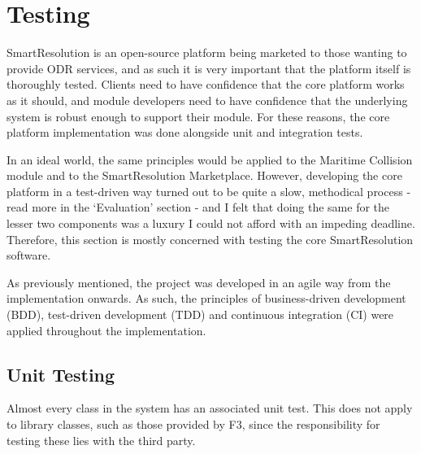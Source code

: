\chapter{Testing} %

SmartResolution is an open-source platform being marketed to those wanting to provide ODR services, and as such it is very important that the platform itself is thoroughly tested. Clients need to have confidence that the core platform works as it should, and module developers need to have confidence that the underlying system is robust enough to support their module. For these reasons, the core platform implementation was done alongside unit and integration tests.

In an ideal world, the same principles would be applied to the Maritime Collision module and to the SmartResolution Marketplace. However, developing the core platform in a test-driven way turned out to be quite a slow, methodical process - read more in the `Evaluation' section - and I felt that doing the same for the lesser two components was a luxury I could not afford with an impeding deadline. Therefore, this section is mostly concerned with testing the core SmartResolution software.

As previously mentioned, the project was developed in an agile way from the implementation onwards. As such, the principles of business-driven development (BDD), test-driven development (TDD) and continuous integration (CI) were applied throughout the implementation.

\section{Unit Testing}

Almost every class in the system has an associated unit test. This does not apply to library classes, such as those provided by F3, since the responsibility for testing these lies with the third party.

